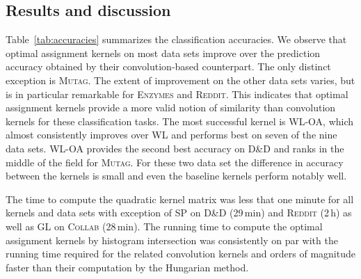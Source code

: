 \documentclass{article}
\begin{document}
\subsection{Results and discussion}
Table~\ref{tab:accuracies} summarizes the classification accuracies. We observe
that optimal assignment kernels on most data sets improve over the prediction
accuracy obtained by their convolution-based counterpart. The only distinct 
exception is \textsc{Mutag}.
The extent of improvement on the other data sets varies, but is in particular
remarkable for \textsc{Enzymes} and \textsc{Reddit}.
This indicates that optimal assignment kernels provide a more valid notion
of similarity than convolution kernels for these classification tasks.
The most successful kernel is WL-OA, which almost consistently 
improves over WL and performs best on seven of the nine data sets. 
WL-OA provides the second best accuracy on \textsc{D\&D} and ranks in the middle 
of the field for \textsc{Mutag}. For these two data set the difference in 
accuracy between the kernels is small and even the baseline kernels perform 
notably well.


The time to compute the quadratic kernel matrix was less that one minute for all 
kernels and data sets with exception of SP on \textsc{D\&D} (29\,min) and 
\textsc{Reddit} (2\,h) as well as GL on \textsc{Collab} (28\,min).
The running time to compute the optimal assignment kernels by histogram 
intersection was consistently on par with the running time required for the 
related convolution kernels and orders of magnitude faster than their 
computation by the Hungarian method. 
\end{document}
